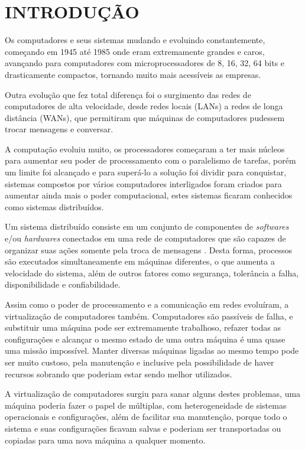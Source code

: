 \chapter{INTRODUÇÃO}
	Os computadores e seus sistemas mudando e evoluindo constantemente, começando em 1945 até 1985 onde eram extremamente grandes e caros, avançando para computadores com microprocessadores de 8, 16, 32, 64 bits e drasticamente compactos, tornando muito mais acessíveis as empresas.
	
	Outra evolução que fez total diferença foi o surgimento das redes de computadores de alta velocidade, desde redes locais (LANs) a redes de longa distância (WANs), que permitiram que máquinas de computadores pudessem trocar mensagens e conversar.
	
	A computação evoluiu muito, os processadores começaram a ter mais núcleos para aumentar seu poder de processamento com o paralelismo de tarefas, porém um limite foi alcançado e para superá-lo a solução foi dividir para conquistar, sistemas compostos por vários computadores interligados foram criados para aumentar ainda mais o poder computacional, estes sistemas ficaram conhecidos como sistemas distribuídos.
	
	Um sistema distribuído consiste em um conjunto de componentes de \textit{softwares} e/ou \textit{hardwares} conectados em uma rede de computadores que são capazes de organizar suas ações somente pela troca de mensagens \cite{Coulouris-2012}. Desta forma, processos são executados simultaneamente em máquinas diferentes, o que aumenta a velocidade do sistema, além de outros fatores como segurança, tolerância a falha, disponibilidade e confiabilidade.
	
	Assim como o poder de processamento e a comunicação em redes evoluíram, a virtualização de computadores também. Computadores são passíveis de falha, e substituir uma máquina pode ser extremamente trabalhoso, refazer todas as configurações e alcançar o mesmo estado de uma outra máquina é uma quase uma missão impossível. Manter diversas máquinas ligadas ao mesmo tempo pode ser muito custoso, pela manutenção e inclusive pela possibilidade de haver recursos sobrando que poderiam estar sendo melhor utilizados.
	
	A virtualização de computadores surgiu para sanar alguns destes problemas, uma máquina poderia fazer o papel de múltiplas, com heterogeneidade de sistemas operacionais e configurações, além de facilitar sua manutenção, porque todo o sistema e suas configurações ficavam salvas e poderiam ser transportadas ou copiadas para uma nova máquina a qualquer momento.
	
